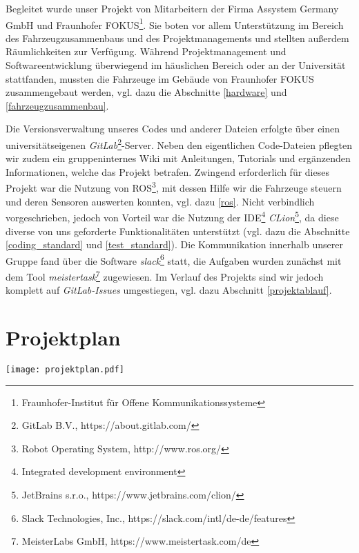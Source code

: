 \documentclass[a4paper, 12pt, titlepage]{scrartcl}
\begin{document}
		Begleitet wurde unser Projekt von Mitarbeitern der Firma Assystem Germany GmbH und Fraunhofer FOKUS\footnote{Fraunhofer-Institut für Offene Kommunikationssysteme}. 
		Sie boten vor allem Unterstützung im Bereich des Fahrzeugzusammenbaus und des Projektmanagements und stellten außerdem 
		Räumlichkeiten zur Verfügung. Während Projektmanagement und Softwareentwicklung überwiegend im häuslichen Bereich oder an der 
		Universität stattfanden, mussten die Fahrzeuge im Gebäude von Fraunhofer FOKUS zusammengebaut werden, vgl. dazu die Abschnitte \ref{hardware} und \ref{fahrzeugzusammenbau}. 
		
		Die Versionsverwaltung unseres Codes und anderer Dateien erfolgte über einen universitätseigenen \emph{GitLab}\footnote{GitLab B.V., https://about.gitlab.com/}-Server. Neben den eigentlichen Code-Dateien pflegten wir zudem ein gruppeninternes 
		Wiki mit Anleitungen, Tutorials und ergänzenden Informationen, welche das Projekt betrafen. 
		Zwingend erforderlich für dieses Projekt war die Nutzung von ROS\footnote{Robot Operating System, http://www.ros.org/}, 
		mit dessen Hilfe wir die Fahrzeuge steuern und deren Sensoren auswerten konnten, vgl. dazu \ref{ros}. 
		Nicht verbindlich vorgeschrieben, jedoch von Vorteil war die Nutzung der IDE\footnote{Integrated development environment} 
		\emph{CLion}\footnote{JetBrains s.r.o., https://www.jetbrains.com/clion/}, da diese diverse von uns geforderte Funktionalitäten unterstützt (vgl. dazu die Abschnitte \ref{coding_standard} und \ref{test_standard}).
		Die Kommunikation innerhalb unserer Gruppe fand über die Software \emph{slack}\footnote{Slack Technologies, Inc., https://slack.com/intl/de-de/features} statt, die Aufgaben wurden zunächst mit dem Tool \emph{meistertask}\footnote{MeisterLabs GmbH, https://www.meistertask.com/de} zugewiesen. Im Verlauf des Projekts sind wir jedoch komplett auf \emph{GitLab-Issues} umgestiegen, vgl. dazu Abschnitt \ref{projektablauf}. 
	
	\section{Projektplan}
	\label{projektplan} 
  \texttt{[image: projektplan.pdf]}
\end{document}
